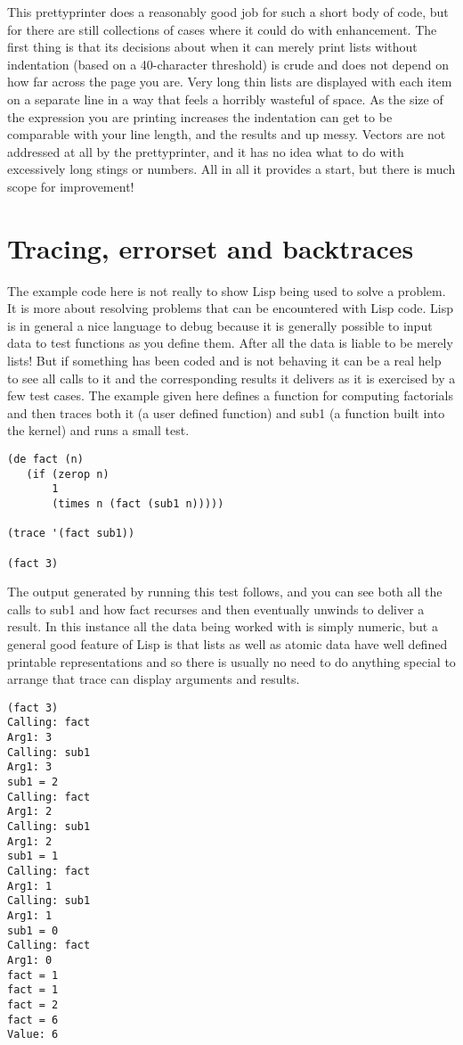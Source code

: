 This prettyprinter does a reasonably good job for such a short body of code,
but for there are still collections of cases where it could do with
enhancement. The first thing is that its decisions about when it
can merely print lists without indentation (based on a 40-character threshold)
is crude and does not depend on how far across the page you are. Very long
thin lists are displayed with each item on a separate line in a way that
feels a horribly wasteful of space. As the size of the expression you are
printing increases the indentation can get to be comparable with your
line length, and the results and up messy. Vectors are not addressed at all
by the prettyprinter, and it has no idea what to do with excessively long
stings or numbers. All in all it provides a start, but there is much scope
for improvement!

\section{Tracing, {\tx errorset} and backtraces}
The example code here is not really to show Lisp being used to
solve a problem. It is more about resolving problems that can be
encountered with Lisp code. Lisp is in general a nice language to
debug because it is generally possible to input data to test functions
as you define them. After all the data is liable to be merely lists!
But if something has been coded and is not behaving it can be a real help
to see all calls to it and the corresponding results it delivers as it is
exercised by a few test cases. The example given here defines a function
for computing factorials and then traces both it (a user defined function)
and {\tx sub1} (a function built into the \vsl{} kernel) and runs a small
test. 
{\small\begin{verbatim}
(de fact (n)
   (if (zerop n)
       1
       (times n (fact (sub1 n)))))

(trace '(fact sub1))

(fact 3)
\end{verbatim}}

The output generated by running this test follows, and you can see both all
the calls to {\tx sub1} and how {\tx fact} recurses and then eventually
unwinds to deliver a result. In this instance all the data being worked with is
simply numeric, but a general good feature of Lisp is that lists as well as
atomic data have well defined printable representations and so there is
usually no need to do anything special to arrange that {\tx trace} can
display arguments and results.
{\small\begin{verbatim}
(fact 3)
Calling: fact
Arg1: 3
Calling: sub1
Arg1: 3
sub1 = 2
Calling: fact
Arg1: 2
Calling: sub1
Arg1: 2
sub1 = 1
Calling: fact
Arg1: 1
Calling: sub1
Arg1: 1
sub1 = 0
Calling: fact
Arg1: 0
fact = 1
fact = 1
fact = 2
fact = 6
Value: 6
\end{verbatim}}

